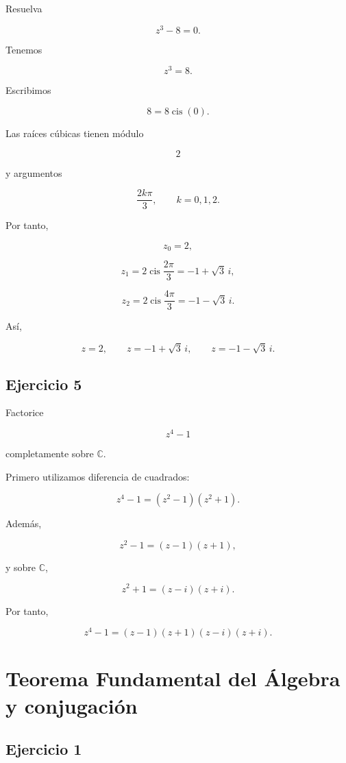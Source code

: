 \documentclass[12pt]{article}
\begin{document}
Resuelva

\[
z^3-8=0.
\]

Tenemos

\[
z^3=8.
\]

Escribimos

\[
8=8\operatorname{cis}(0).
\]

Las raíces cúbicas tienen módulo

\[
2
\]

y argumentos

\[
\frac{2k\pi}{3},
\qquad
k=0,1,2.
\]

Por tanto,

\[
z_0=2,
\]

\[
z_1
=
2\operatorname{cis}\frac{2\pi}{3}
=
-1+\sqrt3\,i,
\]

\[
z_2
=
2\operatorname{cis}\frac{4\pi}{3}
=
-1-\sqrt3\,i.
\]

Así,

\[
\boxed{
z=2,\qquad
z=-1+\sqrt3\,i,\qquad
z=-1-\sqrt3\,i
}.
\]


\subsection*{Ejercicio 5}

Factorice

\[
z^4-1
\]

completamente sobre \(\mathbb{C}\).

Primero utilizamos diferencia de cuadrados:

\[
z^4-1
=
(z^2-1)(z^2+1).
\]

Además,

\[
z^2-1
=
(z-1)(z+1),
\]

y sobre \(\mathbb C\),

\[
z^2+1
=
(z-i)(z+i).
\]

Por tanto,

\[
\boxed{
z^4-1
=
(z-1)(z+1)(z-i)(z+i)
}.
\]

\section*{Teorema Fundamental del Álgebra y conjugación}

\subsection*{Ejercicio 1}
\end{document}
